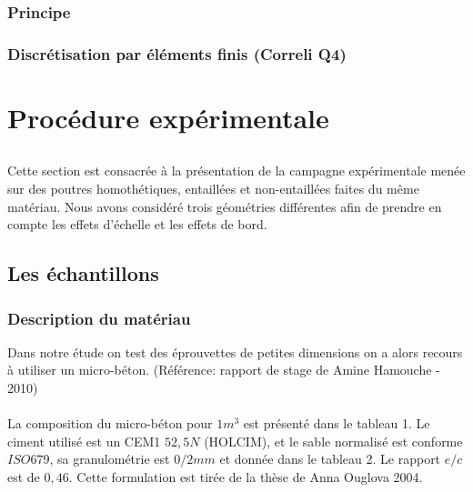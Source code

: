 \documentclass[12pt]{report}
\begin{document}
\section{Principe}


\section{Discrétisation par éléments finis (Correli Q4)}


\part{Procédure expérimentale}
\chapter*{}
Cette section est consacrée à la présentation de la campagne expérimentale menée sur des
poutres homothétiques, entaillées et non-entaillées faites du même matériau. Nous avons
considéré trois géométries différentes afin de prendre en compte les effets d’échelle et les effets
de bord.

\chapter{Les échantillons}
\section{Description du matériau}
Dans notre étude on test des éprouvettes de petites dimensions on a alors recours à utiliser un
micro-béton. (Référence: rapport de stage de Amine Hamouche - 2010)
\\\\
La composition du micro-béton pour $1m^3$ est présenté dans le tableau 1. Le ciment utilisé
est un CEM1 $52,5 N$ (HOLCIM), et le sable normalisé est conforme $ISO  679$, sa granulométrie
est $0/2 mm$ et donnée dans le tableau 2. Le rapport $e/c$ est de $0,46$. Cette formulation est tirée de
la thèse de Anna Ouglova 2004.
\end{document}
